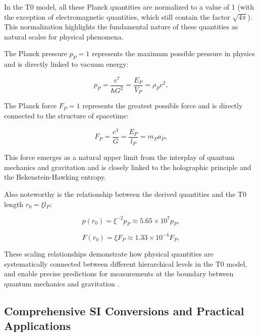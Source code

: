 \documentclass[twocolumn,aps,prl]{revtex4-2}
\begin{document}
	In the T0 model, all these Planck quantities are normalized to a value of 1 (with the exception of electromagnetic quantities, which still contain the factor $\sqrt{4\pi}$). This normalization highlights the fundamental nature of these quantities as natural scales for physical phenomena.
	
	The Planck pressure $p_P = 1$ represents the maximum possible pressure in physics and is directly linked to vacuum energy:
	
	\begin{equation}
		p_P = \frac{c^7}{\hbar G^2} = \frac{E_P}{V_P} = \rho_P c^2, \label{eq:planck_pressure}
	\end{equation}
	
	The Planck force $F_P = 1$ represents the greatest possible force and is directly connected to the structure of spacetime:
	
	\begin{equation}
		F_P = \frac{c^4}{G} = \frac{E_P}{l_P} = m_P a_P, \label{eq:planck_force}
	\end{equation}
	
	This force emerges as a natural upper limit from the interplay of quantum mechanics and gravitation and is closely linked to the holographic principle and the Bekenstein-Hawking entropy.
	
	Also noteworthy is the relationship between the derived quantities and the T0 length $r_0 = \xi l_P$:
	
	\begin{equation}
		p(r_0) = \xi^{-2} p_P \approx 5.65 \times 10^7 p_P, \label{eq:r0_pressure}
	\end{equation}
	
	\begin{equation}
		F(r_0) = \xi F_P \approx 1.33 \times 10^{-4} F_P, \label{eq:r0_force}
	\end{equation}
	
	These scaling relationships demonstrate how physical quantities are systematically connected between different hierarchical levels in the T0 model, and enable precise predictions for measurements at the boundary between quantum mechanics and gravitation \cite{pascher_emergente_2025}.
	
	\subsection{Comprehensive SI Conversions and Practical Applications}
	\label{subsec:detailed_conversions}
	
\end{document}
